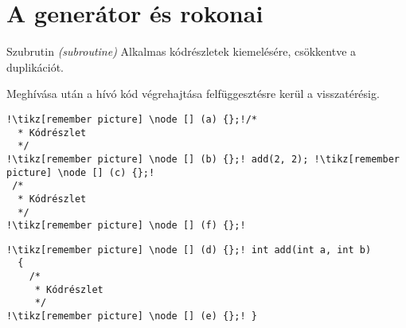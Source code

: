 \section{A generátor és rokonai}


\begin{frame}[fragile]{Szubrutin \textit{(subroutine)}}
Alkalmas kódrészletek kiemelésére, csökkentve a duplikációt.

Meghívása után a hívó kód végrehajtása felfüggesztésre kerül a visszatérésig.
\\
\begin{center}
\begin{minipage}{.40\textwidth}
\begin{lstlisting}[title=Hívó, frame=t, escapechar=!]
!\tikz[remember picture] \node [] (a) {};!/*
  * Kódrészlet
  */
!\tikz[remember picture] \node [] (b) {};! add(2, 2); !\tikz[remember picture] \node [] (c) {};!
 /*
  * Kódrészlet
  */
!\tikz[remember picture] \node [] (f) {};!
\end{lstlisting}
\end{minipage}\hfill
\begin{minipage}{.50\textwidth}
\begin{lstlisting}[title=Szubrutin, frame=t, escapechar=!, showlines=true]
!\tikz[remember picture] \node [] (d) {};! int add(int a, int b)
  {
    /*
     * Kódrészlet
     */
!\tikz[remember picture] \node [] (e) {};! }


\end{lstlisting}
\end{minipage}
\end{center}
\par
\end{frame}


